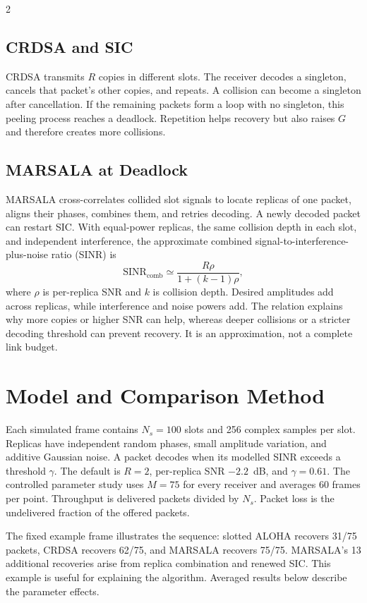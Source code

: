 \documentclass[a4paper,10pt]{article}
\begin{document}
\begin{multicols}{2}
\subsection{CRDSA and SIC}
CRDSA transmits $R$ copies in different slots. The receiver decodes a
singleton, cancels that packet's other copies, and repeats. A collision can
become a singleton after cancellation. If the remaining packets form a loop
with no singleton, this peeling process reaches a deadlock. Repetition helps
recovery but also raises $G$ and therefore creates more collisions.

\subsection{MARSALA at Deadlock}
MARSALA cross-correlates collided slot signals to locate replicas of one
packet, aligns their phases, combines them, and retries decoding. A newly
decoded packet can restart SIC. With equal-power replicas, the same collision
depth in each slot, and independent interference, the approximate combined
signal-to-interference-plus-noise ratio (SINR) is
\begin{equation}
\mathrm{SINR}_{\mathrm{comb}}\simeq
\frac{R\rho}{1+(k-1)\rho},
\label{eq:sinr}
\end{equation}
where $\rho$ is per-replica SNR and $k$ is collision depth. Desired amplitudes
add across replicas, while interference and noise powers add. The relation
explains why more copies or higher SNR can help, whereas deeper collisions or
a stricter decoding threshold can prevent recovery. It is an approximation,
not a complete link budget.

\section{Model and Comparison Method}
Each simulated frame contains $N_s=100$ slots and 256 complex samples per
slot. Replicas have independent random phases, small amplitude variation,
and additive Gaussian noise. A packet decodes when its modelled SINR exceeds
a threshold $\gamma$. The default is $R=2$, per-replica SNR $-2.2$~dB, and
$\gamma=0.61$. The controlled parameter study uses $M=75$ for every receiver
and averages 60 frames per point. Throughput is delivered packets divided by
$N_s$. Packet loss is the undelivered fraction of the offered packets.

The fixed example frame illustrates the sequence: slotted ALOHA recovers
31/75 packets, CRDSA recovers 62/75, and MARSALA recovers 75/75. MARSALA's
13 additional recoveries arise from replica combination and renewed SIC.
This example is useful for explaining the algorithm. Averaged results below describe the
parameter effects.


\end{multicols}
\end{document}
